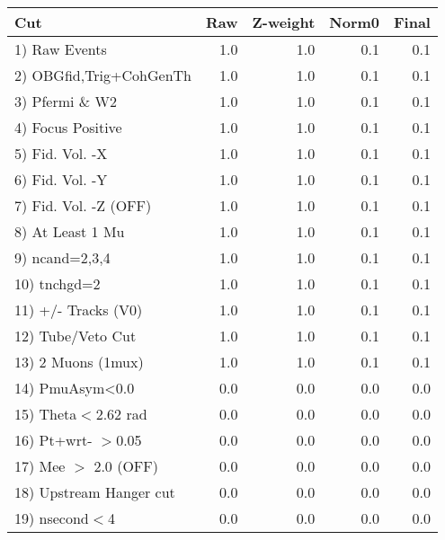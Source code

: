  \begin{table}[h!]\centering
 \begin{tabular}{||l||r|r|r|r||}
 \hline
 \hline
 Cut & Raw & Z-weight & Norm0 & Final \\
 \hline
  1) Raw Events           &         1.0 &         1.0 &         0.1 &         0.1 \\
  2) OBGfid,Trig+CohGenTh &         1.0 &         1.0 &         0.1 &         0.1 \\
  3) Pfermi \& W2         &         1.0 &         1.0 &         0.1 &         0.1 \\
  4) Focus Positive       &         1.0 &         1.0 &         0.1 &         0.1 \\
  5) Fid. Vol. -X         &         1.0 &         1.0 &         0.1 &         0.1 \\
  6) Fid. Vol. -Y         &         1.0 &         1.0 &         0.1 &         0.1 \\
  7) Fid. Vol. -Z (OFF)   &         1.0 &         1.0 &         0.1 &         0.1 \\
  8) At Least 1 Mu        &         1.0 &         1.0 &         0.1 &         0.1 \\
  9) ncand=2,3,4          &         1.0 &         1.0 &         0.1 &         0.1 \\
 10) tnchgd=2             &         1.0 &         1.0 &         0.1 &         0.1 \\
 11) +/- Tracks (V0)      &         1.0 &         1.0 &         0.1 &         0.1 \\
 12) Tube/Veto Cut        &         1.0 &         1.0 &         0.1 &         0.1 \\
 13) 2 Muons (1mux)       &         1.0 &         1.0 &         0.1 &         0.1 \\
 14) PmuAsym<0.0          &         0.0 &         0.0 &         0.0 &         0.0 \\
 15) Theta$<$2.62 rad     &         0.0 &         0.0 &         0.0 &         0.0 \\
 16) Pt+wrt- $>$0.05      &         0.0 &         0.0 &         0.0 &         0.0 \\
 17) Mee $>$ 2.0  (OFF)   &         0.0 &         0.0 &         0.0 &         0.0 \\
 18) Upstream Hanger cut  &         0.0 &         0.0 &         0.0 &         0.0 \\
 19) nsecond$<$4          &         0.0 &         0.0 &         0.0 &         0.0 \\

\end{tabular}
\end{table}
